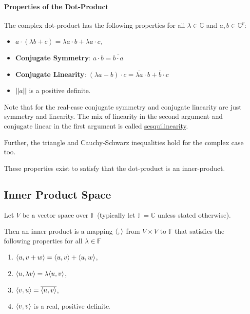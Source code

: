 \paragraph{Properties of the Dot-Product}
The complex dot-product has the following properties for all \( \lambda \in \mathbb{C} \)
and \( a, b \in \mathbb{C}^p \):
\begin{itemize}
    \item \( a\cdot (\lambda b + c) = \lambda a\cdot b + \lambda a \cdot c \),
    \item \textbf{Conjugate Symmetry}: \( a\cdot b = \overline{b \cdot a} \)
    \item \textbf{Conjugate Linearity}:
        \( (\lambda a + b) \cdot c  = \overline{\lambda a} \cdot b  + \overline{b} \cdot c\)
    \item \( ||a|| \) is a positive definite.
\end{itemize}

Note that for the real-case conjugate symmetry and conjugate linearity
are just symmetry and linearity. The mix of linearity in the second argument
and conjugate linear in the first argument is called \underline{sesquilinearity}.

Further, the triangle and Cauchy-Schwarz inequalities hold for the complex
case too.

These properties exist to satisfy that the dot-product is an inner-product.

%
%
%
\subsection{Inner Product Space}
Let \( V \) be a vector space over \( \mathbb{F} \)
(typically let \( \mathbb{F} = \mathbb{C} \) unless stated otherwise).

Then an inner product is a mapping \( \langle ,  \rangle \) from \( V \times V \)
to \( \mathbb{F} \) that satisfies the following properties for all \( \lambda \in \mathbb{F} \)
\begin{enumerate}
    \item \( \langle u, v + w \rangle = \langle u, v \rangle + \langle u, w \rangle \),
    \item \( \langle u, \lambda v \rangle = \lambda \langle u, v \rangle\),
    \item \( \langle v, u \rangle = \overline{\langle u, v \rangle} \),
    \item \( \langle v, v \rangle \) is a real, positive definite.
\end{enumerate}

